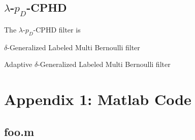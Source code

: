 \documentclass{article}
\begin{document}
\subsection*{$\lambda$-$p_D$-CPHD}
The $\lambda$-$p_D$-CPHD filter\cite{cphd} is

$\delta$-Generalized Labeled Multi Bernoulli filter\cite{efficient_glmb}

Adaptive $\delta$-Generalized Labeled Multi Bernoulli filter\cite{adaptive_dglmb}

\clearpage
\pagebreak
\printbibliography

\section*{Appendix 1: Matlab Code}
\subsection*{foo.m}
\begin{lstlisting}[language=Matlab]
\end{lstlisting}
\end{document}
